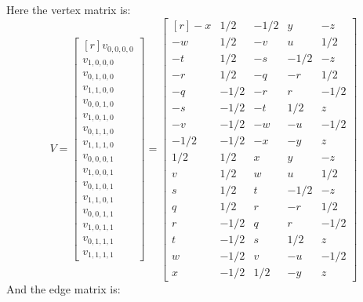 \documentclass[12pt,titlepage]{article}
\numberwithin{equation}{section}
\begin{document}
Here the vertex matrix is:
\begin{equation*}
V =
\begin{bmatrix*}[r]
v_{0,0,0,0} \\
v_{1,0,0,0} \\
v_{0,1,0,0} \\
v_{1,1,0,0} \\
v_{0,0,1,0} \\
v_{1,0,1,0} \\
v_{0,1,1,0} \\
v_{1,1,1,0} \\
v_{0,0,0,1} \\
v_{1,0,0,1} \\
v_{0,1,0,1} \\
v_{1,1,0,1} \\
v_{0,0,1,1} \\
v_{1,0,1,1} \\
v_{0,1,1,1} \\
v_{1,1,1,1}
\end{bmatrix*}
=
\begin{bmatrix*}[r]
  -x &  1/2 & -1/2 &    y &   -z \\
  -w &  1/2 &   -v &    u &  1/2 \\
  -t &  1/2 &   -s & -1/2 &   -z \\
  -r &  1/2 &   -q &   -r &  1/2 \\
  -q & -1/2 &   -r &    r & -1/2 \\
  -s & -1/2 &   -t &  1/2 &    z \\
  -v & -1/2 &   -w &   -u & -1/2 \\
-1/2 & -1/2 &   -x &   -y &    z \\
 1/2 &  1/2 &    x &    y &   -z \\
   v &  1/2 &    w &    u &  1/2 \\
   s &  1/2 &    t & -1/2 &   -z \\
   q &  1/2 &    r &   -r &  1/2 \\
   r & -1/2 &    q &    r & -1/2 \\
   t & -1/2 &    s &  1/2 &    z \\
   w & -1/2 &    v &   -u & -1/2 \\
   x & -1/2 &  1/2 &   -y &    z 
\end{bmatrix*}
\end{equation*}
And the edge matrix is:
\end{document}
